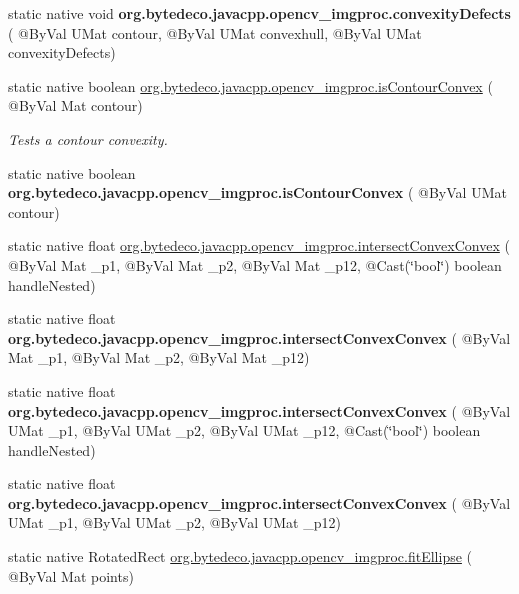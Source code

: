 \begin{DoxyCompactItemize}
static native void {\bfseries org.\+bytedeco.\+javacpp.\+opencv\+\_\+imgproc.\+convexity\+Defects} ( @By\+Val U\+Mat contour, @By\+Val U\+Mat convexhull, @By\+Val U\+Mat convexity\+Defects)
\item 
static native boolean \hyperlink{group__imgproc__shape_gad00ac2d87b83a753b5edcdbb2daf526f}{org.\+bytedeco.\+javacpp.\+opencv\+\_\+imgproc.\+is\+Contour\+Convex} ( @By\+Val Mat contour)
\begin{DoxyCompactList}\small\item\em Tests a contour convexity. \end{DoxyCompactList}\item 
\mbox{\label{group__imgproc__shape_ga8189ade3a7d61fb8ceb6ab782007112b}} 
static native boolean {\bfseries org.\+bytedeco.\+javacpp.\+opencv\+\_\+imgproc.\+is\+Contour\+Convex} ( @By\+Val U\+Mat contour)
\item 
static native float \hyperlink{group__imgproc__shape_ga1664076df6a9c8e2780c3650b12551a1}{org.\+bytedeco.\+javacpp.\+opencv\+\_\+imgproc.\+intersect\+Convex\+Convex} ( @By\+Val Mat \+\_\+p1, @By\+Val Mat \+\_\+p2, @By\+Val Mat \+\_\+p12, @Cast(\char`\"{}bool\char`\"{}) boolean handle\+Nested)
\item 
\mbox{\label{group__imgproc__shape_gada15f5267d8e5a7fbd89874f6442c785}} 
static native float {\bfseries org.\+bytedeco.\+javacpp.\+opencv\+\_\+imgproc.\+intersect\+Convex\+Convex} ( @By\+Val Mat \+\_\+p1, @By\+Val Mat \+\_\+p2, @By\+Val Mat \+\_\+p12)
\item 
\mbox{\label{group__imgproc__shape_ga7a1d0ab280a855959142c809ec18874c}} 
static native float {\bfseries org.\+bytedeco.\+javacpp.\+opencv\+\_\+imgproc.\+intersect\+Convex\+Convex} ( @By\+Val U\+Mat \+\_\+p1, @By\+Val U\+Mat \+\_\+p2, @By\+Val U\+Mat \+\_\+p12, @Cast(\char`\"{}bool\char`\"{}) boolean handle\+Nested)
\item 
\mbox{\label{group__imgproc__shape_ga9e788b99eb471cf0511dfdbad7b6ce23}} 
static native float {\bfseries org.\+bytedeco.\+javacpp.\+opencv\+\_\+imgproc.\+intersect\+Convex\+Convex} ( @By\+Val U\+Mat \+\_\+p1, @By\+Val U\+Mat \+\_\+p2, @By\+Val U\+Mat \+\_\+p12)
\item 
static native Rotated\+Rect \hyperlink{group__imgproc__shape_ga4e705f42eefa1224c87285653b6fb44d}{org.\+bytedeco.\+javacpp.\+opencv\+\_\+imgproc.\+fit\+Ellipse} ( @By\+Val Mat points)

\end{DoxyCompactItemize}

